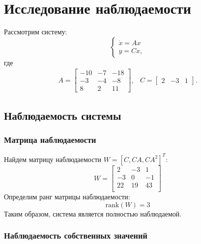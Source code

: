 \section{Исследование наблюдаемости}

Рассмотрим систему: 
\begin{equation}
    \begin{cases}
        \dot{x} = Ax \\
        y = Cx,
    \end{cases}
\end{equation}
где 
\begin{equation}
    \begin{array}{cc}
        A = \begin{bmatrix}
            -10 & -7 & -18 \\
            -3 & -4 & -8 \\
            8 & 2 & 11
        \end{bmatrix}, &
        C = \begin{bmatrix}
            2 & -3 & 1
        \end{bmatrix}.
    \end{array}
\end{equation}

\subsection{Наблюдаемость системы}

\subsubsection{Матрица наблюдаемости}
Найдем матрицу наблюдаемости $W = [C, CA, CA^2]^T$: 
\begin{equation}
    W = \begin{bmatrix}
        2  & -3  & 1 \\ 
        -3  & 0  & -1 \\ 
        22  & 19  & 43 \\ 
    \end{bmatrix}
\end{equation}
Определим ранг матрицы наблюдаемости:
\begin{equation}
    \text{rank}(W) = 3
\end{equation}
Таким образом, система является полностью наблюдаемой.

\subsubsection{Наблюдаемость собственных значений}

